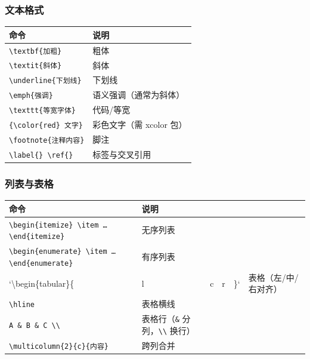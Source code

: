 \subsubsection{文本格式}

\begin{center}
\begin{tabular}{ll}
\toprule
命令 & 说明 \\
\midrule
\verb|\textbf{加粗}| & 粗体 \\
\verb|\textit{斜体}| & 斜体 \\
\verb|\underline{下划线}| & 下划线 \\
\verb|\emph{强调}| & 语义强调（通常为斜体） \\
\verb|\texttt{等宽字体}| & 代码/等宽 \\
\verb|{\color{red} 文字}| & 彩色文字（需 xcolor 包） \\
\verb|\footnote{注释内容}| & 脚注 \\
\verb|\label{} \ref{}| & 标签与交叉引用 \\
\bottomrule
\end{tabular}
\end{center}

\subsubsection{列表与表格}

\begin{center}
\begin{tabular}{llllll}
\toprule
命令 & 说明 &  &  &  &  \\
\midrule
\verb|\begin{itemize} \item … \end{itemize}| & 无序列表 &  &  &  &  \\
\verb|\begin{enumerate} \item … \end{enumerate}| & 有序列表 &  &  &  &  \\
`\textbackslash{}begin\{tabular\}\{ & l & c & r & \}` & 表格（左/中/右对齐） \\
\verb|\hline| & 表格横线 &  &  &  &  \\
\verb|A & B & C \\| & 表格行（\verb|&| 分列，\verb|\\| 换行） &  &  &  &  \\
\verb|\multicolumn{2}{c}{内容}| & 跨列合并 &  &  &  &  \\
\bottomrule
\end{tabular}
\end{center}


